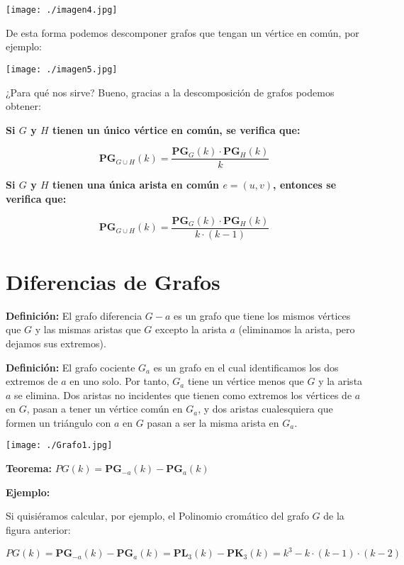 \documentclass[a4paper]{article}
\newcommand{\highlight}[1]{\begin{tcolorbox}[colback=gray!10,colframe=gray!30]#1\end{tcolorbox}}
\begin{document}
\texttt{[image: ./imagen4.jpg]}

De esta forma podemos descomponer grafos que tengan un vértice en común, por ejemplo:

\texttt{[image: ./imagen5.jpg]}

¿Para qué nos sirve? Bueno, gracias a la descomposición de grafos podemos obtener:

\highlight{\textbf{Si $G$ y $H$ tienen un único vértice en común, se verifica que:}}
\[ \textbf{PG}_{G \cup H}(k) = \frac{\textbf{PG}_G(k) \cdot \textbf{PG}_H(k)}{k} \]

\highlight{\textbf{Si $G$ y $H$ tienen una única arista en común $e = (u,v)$, entonces se verifica que:}}
\[ \textbf{PG}_{G \cup H}(k) = \frac{\textbf{PG}_G(k) \cdot \textbf{PG}_H(k)}{k \cdot (k-1)} \]

\section{Diferencias de Grafos}

\textbf{Definición:} El grafo diferencia $G - a$ es un grafo que tiene los mismos vértices que $G$ y las mismas aristas que $G$ excepto la arista $a$ (eliminamos la arista, pero dejamos sus extremos).

\textbf{Definición:} El grafo cociente $G_a$ es un grafo en el cual identificamos los dos extremos de $a$ en uno solo. Por tanto, $G_a$ tiene un vértice menos que $G$ y la arista $a$ se elimina. Dos aristas no incidentes que tienen como extremos los vértices de $a$ en $G$, pasan a tener un vértice común en $G_a$, y dos aristas cualesquiera que formen un triángulo con $a$ en $G$ pasan a ser la misma arista en $G_a$.

\texttt{[image: ./Grafo1.jpg]}

\highlight{\textbf{Teorema:} $PG(k) = \textbf{PG}_{-a}(k) - \textbf{PG}_{a}(k)$}

\highlight{\textbf{Ejemplo:}} Si quisiéramos calcular, por ejemplo, el Polinomio cromático del grafo $G$ de la figura anterior:

\[ PG (k) = \textbf{PG}_{-a}(k) - \textbf{PG}_{a}(k) = \textbf{PL}_3 (k) - \textbf{PK}_3 (k) = k^3 - k \cdot (k-1) \cdot (k-2) \]
\end{document}
